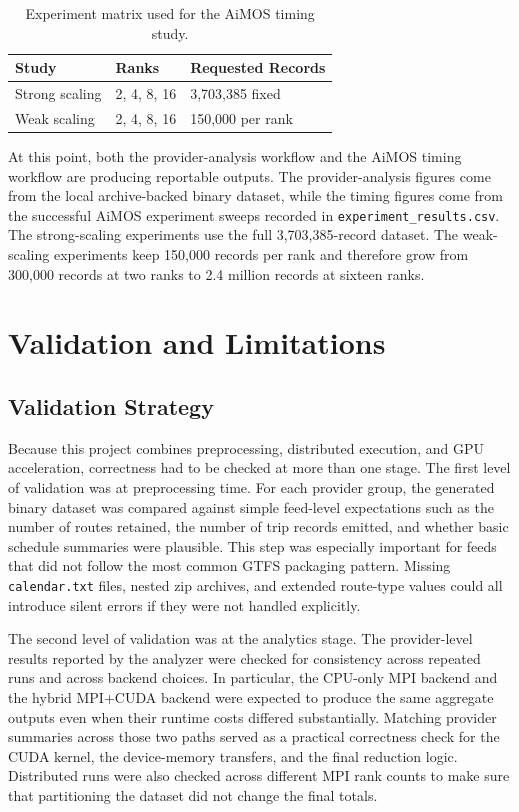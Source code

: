 \documentclass[sigconf,nonacm]{acmart}
\begin{document}
\begin{table}[t]
  \centering
  \caption{Experiment matrix used for the AiMOS timing study.}
  \label{tab:expmatrix}
  \begin{tabular}{lll}
    \toprule
    \textbf{Study} & \textbf{Ranks} & \textbf{Requested Records} \\
    \midrule
    Strong scaling & 2, 4, 8, 16 & 3,703,385 fixed \\
    Weak scaling & 2, 4, 8, 16 & 150,000 per rank \\
    \bottomrule
  \end{tabular}
\end{table}

At this point, both the provider-analysis workflow and the AiMOS timing workflow are producing reportable outputs. The provider-analysis figures come from the local archive-backed binary dataset, while the timing figures come from the successful AiMOS experiment sweeps recorded in \texttt{experiment\_results.csv}. The strong-scaling experiments use the full 3,703,385-record dataset. The weak-scaling experiments keep 150,000 records per rank and therefore grow from 300,000 records at two ranks to 2.4 million records at sixteen ranks.

\section{Validation and Limitations}
\subsection{Validation Strategy}
Because this project combines preprocessing, distributed execution, and GPU acceleration, correctness had to be checked at more than one stage. The first level of validation was at preprocessing time. For each provider group, the generated binary dataset was compared against simple feed-level expectations such as the number of routes retained, the number of trip records emitted, and whether basic schedule summaries were plausible. This step was especially important for feeds that did not follow the most common GTFS packaging pattern. Missing \texttt{calendar.txt} files, nested zip archives, and extended route-type values could all introduce silent errors if they were not handled explicitly.

The second level of validation was at the analytics stage. The provider-level results reported by the analyzer were checked for consistency across repeated runs and across backend choices. In particular, the CPU-only MPI backend and the hybrid MPI+CUDA backend were expected to produce the same aggregate outputs even when their runtime costs differed substantially. Matching provider summaries across those two paths served as a practical correctness check for the CUDA kernel, the device-memory transfers, and the final reduction logic. Distributed runs were also checked across different MPI rank counts to make sure that partitioning the dataset did not change the final totals.
\end{document}
